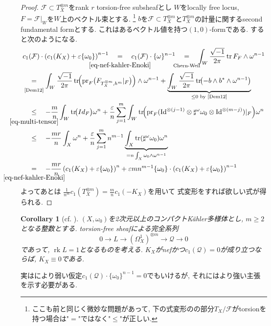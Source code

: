 \documentclass[dvipdfmx,a4paper,11pt]{article} %
\newtheorem{cor}[thm]{Corollary}
\theoremstyle{definition}
\theoremstyle{remark}
\numberwithin{equation}{section}
\newcommand{\rk}[0]{\operatorname{rk}}
\newcommand{\Id}{{\rm Id}}
\newcommand{\underalign}[2]{%
  \quad
  \underset{\mathclap{\raisebox{-1.6ex}{\ensuremath{\scriptstyle #1}}}}{#2}
  \quad
}
\begin{document}
\begin{proof}
 
 $\mathcal{F} \subset T_X^{\otimes m}$をrank $r$ torsion-free subsheafとし
 $W$をlocally free locus, $F=\mathcal{F}\vert_{W}$を$W$上のベクトル束とする. 
\footnote{ここも前と同じく微妙な問題があって, 下の式変形の\cite[Chapter 11]{Dem12}の部分$T_X/\mathcal{F}$がtorsionを持つ場合は"$=$"ではなく"$\leq$"が正しい.}
 $b$を$\mathcal{F} \subset T_X^{\otimes m}$と$T_X^{\otimes m}$の計量に関するsecond fundamental formとする. 
これはあるベクトル値を持つ$(1,0)$-formである. 
すると次のようになる. 
\begin{align*}
& c_1(\mathcal{F}) \cdot 
\left(c_1(K_X) + \varepsilon \{ \omega_0\} \right)^{n-1}
\underalign{\eqref{eq-nef-kahler-Enoki}}{=} c_1(\mathcal{F}) \cdot \{\omega\}^{n-1}
\underalign{\text{Chern-Weil}}{=}
\int_{W} \frac{\sqrt{-1}}{2\pi} \operatorname{tr} F_{F} \wedge \omega^{n-1} 
\\
&\underalign{\text{\cite[Chapter 11]{Dem12}}}{=} 
\int_{W} 
 \frac{\sqrt{-1}}{2\pi} \operatorname{tr}\!\Bigl(\mathrm{pr}_F
\bigl(F_{T_{X}^{\otimes m},h^{m}}\vert_F\bigr)\Bigr)\wedge \omega^{n-1} 
+
\underbrace{\int_{W} \frac{\sqrt{-1}}{2\pi} \operatorname{tr}\!\bigl(-b\wedge b^{*}\wedge \omega^{n-1}\bigr)}_{\leq 0 \text{ by \cite[Chapter 11]{Dem12}}}
 \\
&\underalign{\eqref{eq-multi-tensor}}{\leq}
 -\frac{m}{n}
 \int_{W} 
\operatorname{tr}\!
\bigl(
Id_{F}
\bigr)\omega^{n}
 +
 \frac{\varepsilon }{n}
\sum_{j=1}^m
\int_{W}
 \operatorname{tr}\!\Bigl(\mathrm{pr}_F(
 \Id^{\otimes(j-1)}
\otimes \sharp^\omega\omega_0
\otimes
\Id^{\otimes(m-j)})\vert_{F} \Bigr)\omega^{n}
 \\
 &\underalign{}{\leq}
-\frac{mr}{n} \int_{X} \omega^{n}
+
\frac{\varepsilon}{n}
\sum_{j=1}^m
n^{m-1}
\underbrace{\int_{X}
 \operatorname{tr}(\sharp^{\omega}\omega_0) \omega^{n} 
 }_{= n \int_{X} \omega_0 \wedge \omega^{n-1}}
 \\
&\underalign{\eqref{eq-nef-kahler-Enoki}}{=}
  -\frac{mr}{n} \left(c_1(K_X) + \varepsilon \{ \omega_0\} \right)^{n}
  +\varepsilon m n^{m-1} \{\omega_0\} \cdot  \left(c_1(K_X) + \varepsilon \{ \omega_0\} \right)^{n-1}
\end{align*}
よってあとは
$\frac{1}{n^m}
c_1(T_{X}^{\otimes m}) = \frac{m}{n}c_1(-K_X)$を用いて
式変形をすれば欲しい式が得られる. 

 
 \end{proof}


\begin{cor}[{cf. \cite[Subsection 5]{CPa16}}]
$(X, \omega_0)$を2次元以上のコンパクトK\"ahler多様体とし, $m \geq 2$となる整数とする. torsion-free sheafによる完全系列
\[
0 \longrightarrow L \longrightarrow \left(\Omega_{X}^{1}\right)^{\otimes m} \longrightarrow \mathcal{Q} \longrightarrow 0
\]
であって, $\rk L =1$となるものを考える. $K_X$がnefかつ$c_1(\mathcal{Q})=0$が成り立つならば, $K_X \equiv 0$である. 
\end{cor}
実は\cite{CPa16}により弱い仮定$c_1(\mathcal{Q}) \cdot \{ \omega_{0}\}^{n-1}=0$でもいけるが, それにはより強い主張を示す必要がある.
\end{document}
